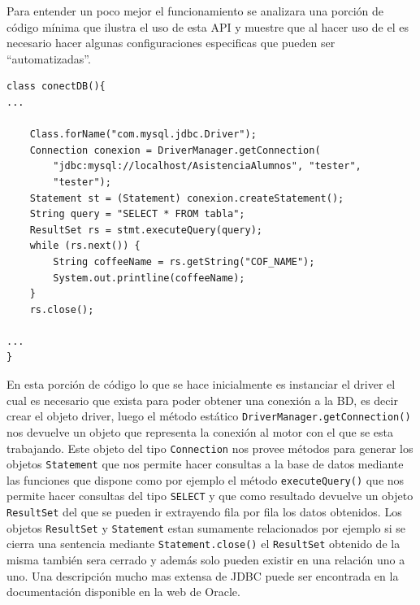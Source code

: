 Para entender un poco mejor el funcionamiento se analizara una porción de código mínima que ilustra el uso de esta API y muestre que al hacer uso de el es necesario hacer algunas configuraciones especificas que pueden ser ``automatizadas''.
%
\begin{lstlisting}[title=Porción de código java para la conexión a una base de datos]
class conectDB(){
...

	Class.forName("com.mysql.jdbc.Driver");
	Connection conexion = DriverManager.getConnection(
		"jdbc:mysql://localhost/AsistenciaAlumnos", "tester",
		"tester");
	Statement st = (Statement) conexion.createStatement();
	String query = "SELECT * FROM tabla";
	ResultSet rs = stmt.executeQuery(query);
	while (rs.next()) {
		String coffeeName = rs.getString("COF_NAME");
		System.out.printline(coffeeName);
	}
	rs.close();

...
}
\end{lstlisting}

En esta porción de código lo que se hace inicialmente es instanciar el driver el cual es necesario que exista para poder obtener una conexión a la BD, es decir crear el objeto driver, luego el método estático \verb=DriverManager.getConnection()= nos devuelve un objeto que representa la conexión al motor con el que se esta trabajando. Este objeto del tipo \verb=Connection= nos provee métodos para generar los objetos \verb=Statement= que nos permite hacer consultas a la base de datos mediante las funciones que dispone como por ejemplo el método \verb=executeQuery()= que nos permite hacer consultas del tipo \verb=SELECT= y que como resultado devuelve un objeto \verb=ResultSet= del que se pueden ir extrayendo fila por fila los datos obtenidos. Los objetos \verb=ResultSet= y \verb=Statement= estan sumamente relacionados por ejemplo si se cierra una sentencia mediante \verb=Statement.close()= el \verb=ResultSet= obtenido de la misma también sera cerrado y además solo pueden existir en una relación uno a uno. Una descripción mucho mas extensa de JDBC puede ser encontrada en la documentación disponible en la web de Oracle\citep{java:jdbc}.
%
